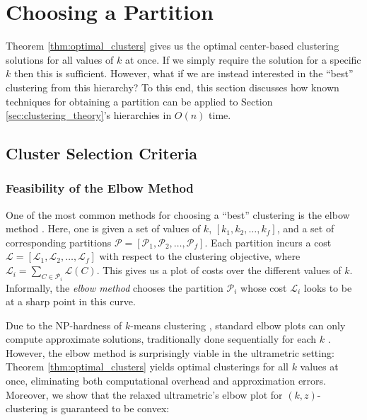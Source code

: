 \section{Choosing a Partition}\label{sec:best_clustering}

Theorem \ref{thm:optimal_clusters} gives us the optimal center-based clustering solutions for all values of $k$ at once. If we simply require the solution for a specific $k$ then this is sufficient. However, what if we are instead interested in the ``best'' clustering from this hierarchy? To this end, this section discusses how known techniques for obtaining a partition can be applied to Section \ref{sec:clustering_theory}'s hierarchies in $O(n)$ time.

\subsection{Cluster Selection Criteria}

\subsubsection{Feasibility of the Elbow Method}\label{sec:elbow}

One of the most common methods for choosing a ``best'' clustering is the elbow method \citep{elbow_original}. Here, one is given a set of values of $k$, $[k_1, k_2, \ldots, k_f]$, and a set of corresponding partitions $\mathcal{P} = [\mathcal{P}_{1}, \mathcal{P}_{2}, \ldots, \mathcal{P}_{f}]$. Each partition incurs a cost $\mathcal{L} = [\mathcal{L}_{1}, \mathcal{L}_{2}, \ldots, \mathcal{L}_{f}]$ with respect to the clustering objective, where $\mathcal{L}_i = \sum_{C \in \mathcal{P}_i} \mathcal{L}(C)$. This gives us a plot of costs over the different values of $k$. Informally, the \emph{elbow method} chooses the partition $\mathcal{P}_i$ whose cost $\mathcal{L}_i$ looks to be at a sharp point in this curve.

Due to the NP-hardness of $k$-means clustering \cite{kmeans_hardness_1}, standard elbow plots can only compute approximate solutions, traditionally done sequentially for each $k$ \cite{elbow_issues}. However, the elbow method is surprisingly viable in the ultrametric setting: Theorem \ref{thm:optimal_clusters} yields optimal clusterings for all $k$ values at once, eliminating both computational overhead and approximation errors. Moreover, we show that the relaxed ultrametric's elbow plot for $(k, z)$-clustering is guaranteed to be convex:

